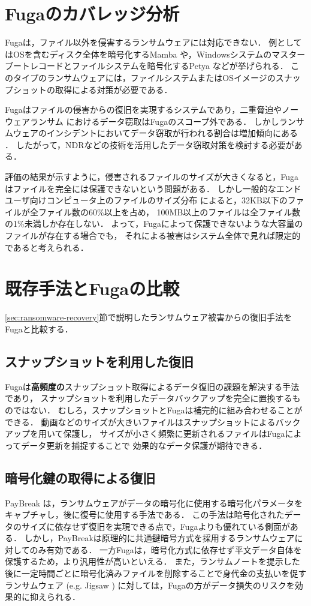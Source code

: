 \section{Fugaのカバレッジ分析}
Fugaは，ファイル以外を侵害するランサムウェアには対応できない．
例としてはOSを含むディスク全体を暗号化するMamba \cite{mamba-petya} や，Windowsシステムのマスターブートレコードとファイルシステムを暗号化するPetya \cite{mamba-petya} などが挙げられる．
このタイプのランサムウェアには，ファイルシステムまたはOSイメージのスナップショットの取得による対策が必要である．

Fugaはファイルの侵害からの復旧を実現するシステムであり，二重脅迫やノーウェアランサム \cite{nowhere-ransom} におけるデータ窃取はFugaのスコープ外である．
しかしランサムウェアのインシデントにおいてデータ窃取が行われる割合は増加傾向にある \cite{sophos-report:online}．
したがって，NDRなどの技術を活用したデータ窃取対策を検討する必要がある．

評価の結果が示すように，侵害されるファイルのサイズが大きくなると，Fugaはファイルを完全には保護できないという問題がある．
しかし一般的なエンドユーザ向けコンピュータ上のファイルのサイズ分布 \cite{file-size-dist} によると，32KB以下のファイルが全ファイル数の60\%以上を占め，
100MB以上のファイルは全ファイル数の1\%未満しか存在しない．
よって，Fugaによって保護できないような大容量のファイルが存在する場合でも，
それによる被害はシステム全体で見れば限定的であると考えられる．


\section{既存手法とFugaの比較}
\ref{sec:ransomware-recovery}節で説明したランサムウェア被害からの復旧手法をFugaと比較する．
\subsection{スナップショットを利用した復旧}
Fugaは\textbf{高頻度の}スナップショット取得によるデータ復旧の課題を解決する手法であり，
スナップショットを利用したデータバックアップを完全に置換するものではない．
むしろ，スナップショットとFugaは補完的に組み合わせることができる．
動画などのサイズが大きいファイルはスナップショットによるバックアップを用いて保護し，
サイズが小さく頻繁に更新されるファイルはFugaによってデータ更新を捕捉することで
効果的なデータ保護が期待できる．

\subsection{暗号化鍵の取得による復旧}
PayBreak \cite{kolodenker2017paybreak}は，ランサムウェアがデータの暗号化に使用する暗号化パラメータをキャプチャし，後に復号に使用する手法である．
この手法は暗号化されたデータのサイズに依存せず復旧を実現できる点で，Fugaよりも優れている側面がある．
しかし，PayBreakは原理的に共通鍵暗号方式を採用するランサムウェアに対してのみ有効である．
一方Fugaは，暗号化方式に依存せず平文データ自体を保護するため，より汎用性が高いといえる．
また，ランサムノートを提示した後に一定時間ごとに暗号化済みファイルを削除することで身代金の支払いを促すランサムウェア (e.g. Jigsaw \cite{byrne2017jigsaw})
に対しては，Fugaの方がデータ損失のリスクを効果的に抑えられる．

